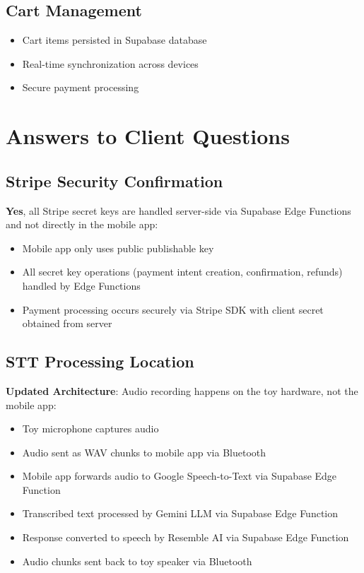\documentclass[11pt,a4paper]{article}
\begin{document}
\subsection{Cart Management}
\begin{itemize}
    \item Cart items persisted in Supabase database
    \item Real-time synchronization across devices
    \item Secure payment processing
\end{itemize}

\section{Answers to Client Questions}

\subsection{Stripe Security Confirmation}
\textbf{Yes}, all Stripe secret keys are handled server-side via Supabase Edge Functions and not directly in the mobile app:
\begin{itemize}
    \item Mobile app only uses public publishable key
    \item All secret key operations (payment intent creation, confirmation, refunds) handled by Edge Functions
    \item Payment processing occurs securely via Stripe SDK with client secret obtained from server
\end{itemize}

\subsection{STT Processing Location}
\textbf{Updated Architecture}: Audio recording happens on the toy hardware, not the mobile app:
\begin{itemize}
    \item Toy microphone captures audio
    \item Audio sent as WAV chunks to mobile app via Bluetooth
    \item Mobile app forwards audio to Google Speech-to-Text via Supabase Edge Function
    \item Transcribed text processed by Gemini LLM via Supabase Edge Function
    \item Response converted to speech by Resemble AI via Supabase Edge Function
    \item Audio chunks sent back to toy speaker via Bluetooth
\end{itemize}
\end{document}
